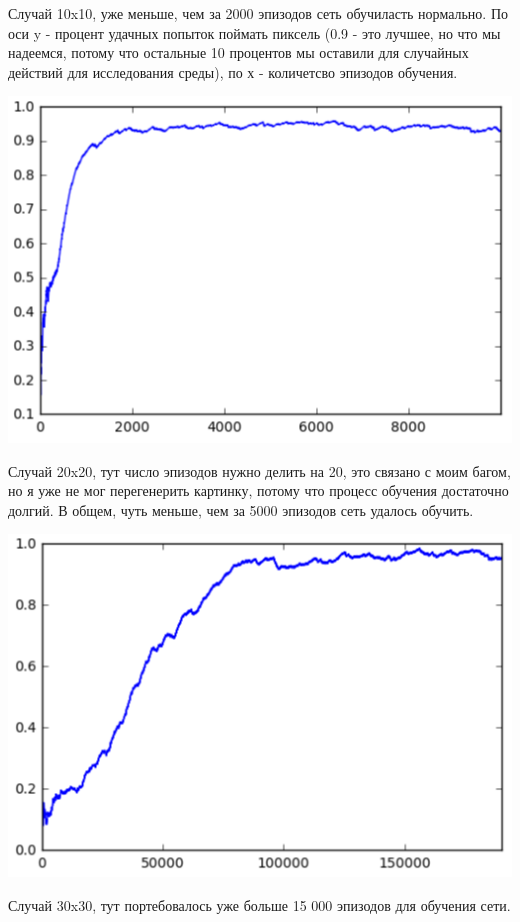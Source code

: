 \documentclass[a4paper]{article}
\begin{document}
Случай 10x10, уже меньше, чем за 2000 эпизодов сеть обучиласть нормально. По оси y - процент удачных попыток поймать пиксель (0.9 - это лучшее, но что мы надеемся, потому что остальные 10 процентов мы оставили для случайных действий для исследования среды), по х - количетсво эпизодов обучения.
\begin{center}
\includegraphics[scale=0.5]{perf10}
\end{center} 
Случай 20x20, тут число эпизодов нужно делить на 20, это связано с моим багом, но я уже не мог перегенерить картинку, потому что процесс обучения достаточно долгий. В общем, чуть меньше, чем за 5000 эпизодов сеть удалось обучить.
\begin{center}
\includegraphics[scale=0.5]{perf20}
\end{center} 
Случай 30x30, тут портебовалось уже больше 15 000 эпизодов для обучения сети.
\end{document}
